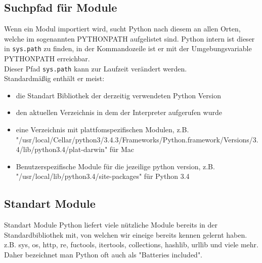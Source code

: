 \begin{frame}
	
	
\end{frame}

\subsection{Suchpfad für Module}
\begin{frame}
	Wenn ein Modul importiert wird, sucht Python nach diesem an allen Orten, welche im sogenannten PYTHONPATH aufgelistet sind. Python intern ist dieser in \texttt{sys.path} zu finden, in der Kommandozeile ist er mit der Umgebungsvariable PYTHONPATH erreichbar.\\
	Dieser Pfad \texttt{sys.path} kann zur Laufzeit verändert werden.\\
	Standardmäßig enthält er meist:
	\begin{itemize}
		\item die Standart Bibliothek der derzeitig verwendeten Python Version
		\item den aktuellen Verzeichnis in dem der Interpreter aufgerufen wurde
		\item eine Verzeichnis mit plattfomspezifischen Modulen, z.B. "/usr/local/Cellar/python3/3.4.3/Frameworks/Python.framework/Versions/3.4/lib/python3.4/plat-darwin" für Mac
		\item Benutzerspezifische Module für die jezeilige python version, z.B. "/usr/local/lib/python3.4/site-packages" für Python 3.4
	\end{itemize}
\end{frame}

\subsection{Standart Module}
\begin{frame}{Standart Module}
	Python liefert viele nützliche Module bereits in der Standardbibliothek mit, von welchen wir eineige bereits kennen gelernt haben.
	z.B. sys, os, http, re, fuctools, itertools, collections, hashlib, urllib und viele mehr. Daher bezeichnet man Python oft auch als "Batteries included".
\end{frame}

